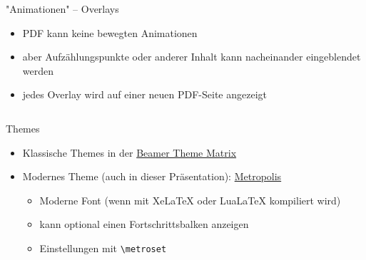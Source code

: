 \documentclass[presentation,aspectratio=169]{beamer}
\begin{document}
\begin{frame}[fragile]{"Animationen" -- Overlays}
  \begin{itemize}
    \item PDF kann keine bewegten Animationen
    \item aber Aufzählungspunkte oder anderer Inhalt kann nacheinander eingeblendet werden
    \item jedes Overlay wird auf einer neuen PDF-Seite angezeigt
      \inputminted{latex}{codebeispiele/beamer-overlays.tex}
  \end{itemize}
\end{frame}

\begin{frame}[fragile]{Themes}
  \begin{itemize}
    \item Klassische Themes in der \href{https://hartwork.org/beamer-theme-matrix/}{Beamer Theme Matrix}
    \item Modernes Theme (auch in dieser Präsentation): \href{https://ctan.org/pkg/beamertheme-metropolis}{Metropolis}
      \begin{itemize}
        \item Moderne Font (wenn mit Xe\LaTeX{} oder Lua\LaTeX{} kompiliert wird)
        \item kann optional einen Fortschrittsbalken anzeigen
        \item Einstellungen mit \verb|\metroset|
      \end{itemize}
  \end{itemize}
\end{frame}
\end{document}
